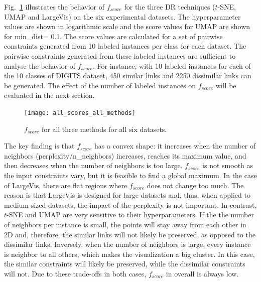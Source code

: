 Fig.~\ref{fig:score:all} illustrates the behavior of $f_{score}$ for the three DR techniques ($t$-SNE, UMAP and LargeVis) on the six experimental datasets.
The hyperparameter values are shown in logarithmic scale and the score values for UMAP are shown for {min\_dist= 0.1}.
The score values are calculated for a set of pairwise constraints generated from 10 labeled instances per class for each dataset.
The pairwise constraints generated from these labeled instances are sufficient to analyse the behavior of $f_{score}$.   
For instance, with 10 labeled instances for each of the 10 classes of DIGITS dataset, 450 similar links and 2250 dissimilar links can be generated.
The effect of the number of labeled instances on $f_{score}$ will be evaluated in the next section.

\begin{figure}%
    \centering
    \texttt{[image: all\_scores\_all\_methods]}
    \caption{$f_{score}$ for all three methods for all six datasets.}
    \label{fig:score:all}
\end{figure}

The key finding is that $f_{score}$ has a convex shape: it increases when the number of neighbors (perplexity/{n\_neighbors}) increases, reaches its maximum value, and then decreases when the number of neighbors is too large.
$f_{score}$ is not smooth as the input constraints vary, but it is feasible to find a global maximum.
In the case of LargeVis, there are flat regions where $f_{score}$ does not change too much.
The reason is that LargeVis is designed for large datasets and, thus, when applied to medium-sized datasets,
the impact of the perplexity is not important.
In contrast, $t$-SNE and UMAP are very sensitive to their hyperparameters.
If the the number of neighbors per instance is small, the points will stay away from each other in 2D and, therefore, the similar links will not likely be preserved, as opposed to the dissimilar links.
Inversely, when the number of neighbors is large, every instance is neighbor to all others, which makes the visualization a big cluster.
In this case, the similar constraints will likely be preserved, while the dissimilar constraints will not.
Due to these trade-offs in both cases, $f_{score}$ in overall is always low.

